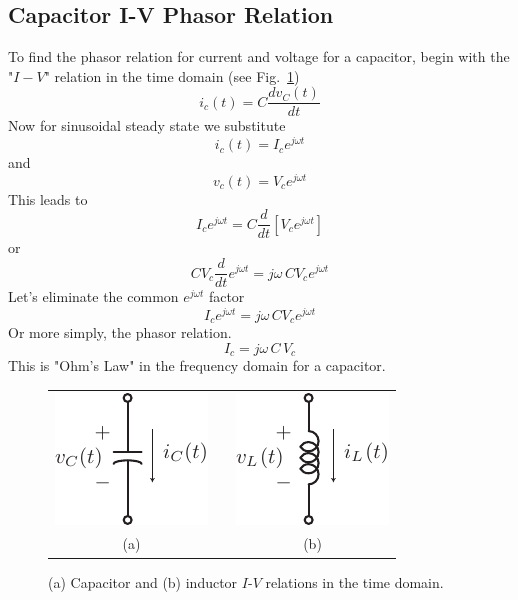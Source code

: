 \subsection{Capacitor I-V Phasor Relation}
To find the phasor relation for current and voltage for a capacitor, begin with the "$I-V$" relation in the time domain (see Fig.~\ref{fig:lcphasor})
    \begin{equation}
        {i_c}(t) = C\frac{{d{v_C}(t)}}{{dt}}
    \end{equation}
Now for sinusoidal steady state we substitute
    \begin{equation}
        {i_c}(t) = {I_c}{e^{j\omega t}}
    \end{equation}
and
    \begin{equation}
        {v_c}(t) = {V_c}{e^{j\omega t}}
    \end{equation}
This leads to
    \begin{equation}
        {I_c}{e^{j\omega t}} = C\frac{d}{{dt}}[{V_c}{e^{j\omega t}}]
    \end{equation}
or
    \begin{equation}
        C{V_c}\frac{d}{{dt}}{e^{j\omega t}} = j\omega \,C{V_c}{e^{j\omega t}}
    \end{equation}
Let's eliminate the common $e^{j\omega t}$ factor
    \begin{equation}
        {I_c}{e^{j\omega t}} = j\omega \,C{V_c}{e^{j\omega t}}
    \end{equation}
Or more simply, the phasor relation.  
    \begin{equation}
        {I_c} = j\omega \,C\,{V_c}
    \end{equation}
This is "Ohm's Law" in the frequency domain for a capacitor.
\begin{figure}[tb]
\begin{center}
\begin{tabular}{ccc}
\includegraphics[width=.25\columnwidth]{mod1_3_3_cap} & \hspace{1cm} &
\includegraphics[width=.25\columnwidth]{mod1_3_4_ind} \\
(a) & & (b) \\
\end{tabular}
\end{center}
\caption{(a) Capacitor and (b) inductor  $I$-$V$ relations in the time domain.}
\label{fig:lcphasor}
\end{figure}
